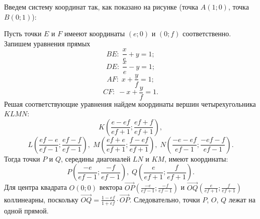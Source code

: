 \solutionSection
Введем систему координат так, как показано на рисунке (точка $A(1;0)$, точка $B(0;1)$): 

Пусть точки $E$  и $F$ имееют координаты $(e;0)$ и $(0;f)$ соответственно. Запишем уравнения прямых
$$BE:\; \dfrac{x}{e}+y=1;$$ 
$$DE:\; \dfrac{x}{e}-y=1;$$ 
$$AF:\;  x+\dfrac{y}{f}=1;$$ 
$$CF:\;  -x+\dfrac{y}{f}=1.$$
Решая соответствующие уравнения найдем координаты вершин четырехугольника $KLMN$: $$K\left(\frac{e-ef}{ef+1};\frac{ef+f}{ef+1}\right),$$ $$L\left(\frac{ef-e}{ef-1};\frac{ef-f}{ef-1}\right),\; M\left(\frac{ef+e}{ef+1};\frac{f-ef}{ef+1}\right),\;N\left(\frac{-e-ef}{ef-1};\frac{-ef-f}{ef-1}\right).$$
Тогда точки $P$ и $Q$, середины диагоналей $LN$ и $KM$,  имеют координаты: $$P\left(\frac{-e}{ef-1};\frac{-f}{ef-1}\right),\; Q\left(\frac{e}{ef+1};\frac{f}{ef+1}\right).$$ 
Для центра квадрата $O(0;0)$ вектора $\overrightarrow{OP}\left(\frac{-e}{ef-1};\frac{-f}{ef-1}\right)$ и $ \overrightarrow{OQ}\left(\frac{e}{ef+1};\frac{f}{ef+1}\right)$ коллинеарны, поскольку $\overrightarrow{OQ}=\frac{1-ef}{1+ef}\cdot\overrightarrow{OP}$. Следовательно, точки $P$, $O$, $Q$ лежат на одной прямой.

